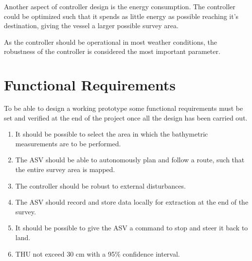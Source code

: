 Another aspect of controller design is the energy consumption. 
The controller could be optimized such that it spends as little energy as possible reaching it's destination, giving the vessel a larger possible survey area. 

As the controller should be operational in most weather conditions, the robustness of the controller is considered the most important parameter. 



\section{Functional Requirements} \label{sec:requirements}
To be able to design a working prototype some functional requirements must be set and verified at the end of the project once all the design has been carried out.
%
\begin{enumerate}
  \item It should be possible to select the area in which the bathymetric measurements are to be performed.
  \item The ASV should be able to autonomously plan and follow a route, such that the entire survey area is mapped.
  \item The controller should be robust to external disturbances.
  \item The ASV should record and store data locally for extraction at the end of the survey.
  \item It should be possible to give the ASV a command to stop and steer it back to land.
  \item THU not exceed 30 cm with a 95\% confidence interval.
\end{enumerate}
%






